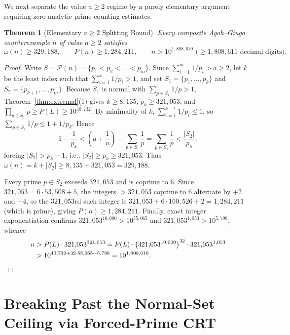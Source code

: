 \documentclass[11pt]{article}
\newtheorem{theorem}{Theorem}[section]
\theoremstyle{remark}
\newcommand{\PP}{\mathcal{P}}
\begin{document}
We next separate the value $a \ge 2$ regime by a purely elementary argument
requiring zero analytic prime-counting estimates.

\begin{theorem}[Elementary $a \ge 2$ Splitting Bound]\label{thm:a-ge-2}
Every composite Agoh--Giuga counterexample $n$ of value $a \ge 2$ satisfies
\[
  \omega(n) \ge 329{,}188,
  \qquad
  P(n) \ge 1{,}284{,}211,
  \qquad
  n > 10^{1{,}808{,}610} \text{ ($\ge 1{,}808{,}611$ decimal digits)}.
\]
\end{theorem}

\begin{proof}
Write $S = \PP(n) = \{p_1 < p_2 < \dots < p_m\}$. Since $\sum_{i=1}^m 1/p_i > a \ge 2$,
let $k$ be the least index such that $\sum_{i=1}^k 1/p_i > 1$, and set
$S_1 = \{p_1,\dots,p_k\}$ and $S_2 = \{p_{k+1},\dots,p_m\}$. Because $S_1$ is
normal with $\sum_{p\in S_1} 1/p > 1$, Theorem~\ref{thm:extremal}(1) gives
$k \ge 8{,}135$, $p_k \ge 321{,}053$, and $\prod_{p\in S_1} p \ge P(L) \ge 10^{40{,}732}$.
By minimality of $k$, $\sum_{i=1}^{k-1} 1/p_i \le 1$, so
$\sum_{p\in S_1} 1/p \le 1 + 1/p_k$. Hence
\[
  1 - \frac{1}{p_k} < \left(a + \frac{1}{n}\right) - \sum_{p\in S_1}\frac{1}{p}
  = \sum_{p\in S_2}\frac{1}{p} < \frac{|S_2|}{p_k},
\]
forcing $|S_2| > p_k - 1$, i.e., $|S_2| \ge p_k \ge 321{,}053$. Thus
$\omega(n) = k + |S_2| \ge 8{,}135 + 321{,}053 = 329{,}188$.

Every prime $p \in S_2$ exceeds $321{,}053$ and is coprime to $6$. Since
$321{,}053 = 6\cdot 53{,}508 + 5$, the integers $> 321{,}053$ coprime to $6$
alternate by $+2$ and $+4$, so the $321{,}053$rd such integer is
$321{,}053 + 6\cdot 160{,}526 + 2 = 1{,}284{,}211$ (which is prime), giving
$P(n) \ge 1{,}284{,}211$. Finally, exact integer exponentiation confirms
$321{,}053^{10{,}000} > 10^{55{,}065}$ and $321{,}053^{1{,}053} > 10^{5{,}798}$,
whence
\begin{align*}
  n &> P(L)\cdot 321{,}053^{321{,}053}
     = P(L)\cdot\bigl(321{,}053^{10{,}000}\bigr)^{32}\cdot 321{,}053^{1{,}053} \\
    &> 10^{40{,}732 + 32\cdot 55{,}065 + 5{,}798} = 10^{1{,}808{,}610}. \qedhere
\end{align*}
\end{proof}

\section{Breaking Past the Normal-Set Ceiling via Forced-Prime CRT}
\label{sec:tier2}
\end{document}
